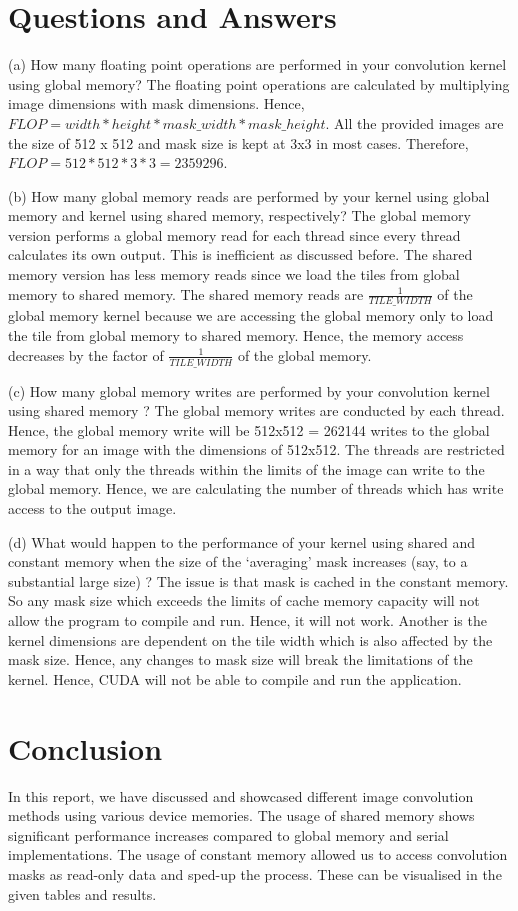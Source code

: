 \section{Questions and Answers}
(a) How many floating point operations are performed in your convolution kernel using global memory?
The floating point operations are calculated by multiplying image dimensions with mask dimensions. Hence, \(FLOP = width * height * mask\_width * mask\_height\). All the provided images are the size of 512 x 512 and mask size is kept at 3x3 in most cases. Therefore, $FLOP = 512 * 512 * 3 * 3 = 2 359 296$.

(b) How many global memory reads are performed by your kernel using global memory and kernel using shared memory, respectively?
The global memory version performs a global memory read for each thread since every thread calculates its own output. This is inefficient as discussed before. The shared memory version has less memory reads since we load the tiles from global memory to shared memory. The shared memory reads are $\frac{1}{TILE\_WIDTH}$ of the global memory kernel because we are accessing the global memory only to load the tile from global memory to shared memory. Hence, the memory access decreases by the factor of $\frac{1}{TILE\_WIDTH}$ of the global memory.

(c) How many global memory writes are performed by your convolution kernel using shared memory ?
The global memory writes are conducted by each thread. Hence, the global memory write will be 512x512 = 262144 writes to the global memory for an image with the dimensions of 512x512. The threads are restricted in a way that only the threads within the limits of the image can write to the global memory. Hence, we are calculating the number of threads which has write access to the output image.

(d) What would happen to the performance of your kernel using shared and constant memory when the size of the ‘averaging’ mask increases (say, to a substantial large size) ?
The issue is that mask is cached in the constant memory. So any mask size which exceeds the limits of cache memory capacity will not allow the program to compile and run. Hence, it will not work. Another is the kernel dimensions are dependent on the tile width which is also affected by the mask size. Hence, any changes to mask size will break the limitations of the kernel. Hence, CUDA will not be able to compile and run the application.

\section{Conclusion} 
In this report, we have discussed and showcased different image convolution methods using various device memories. The usage of shared memory shows significant performance increases compared to global memory and serial implementations. The usage of constant memory allowed us to access convolution masks as read-only data and sped-up the process.  These can be visualised in the given tables and results. 

\newpage



 

